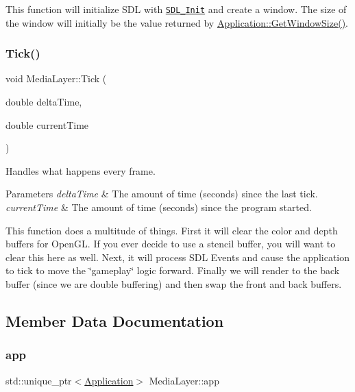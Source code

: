 This function will initialize S\+DL with \href{https://wiki.libsdl.org/SDL_Init}{\tt S\+D\+L\+\_\+\+Init} and create a window. The size of the window will initially be the value returned by \hyperlink{class_application_ab190ae0e987fe95682714dd4b2495e82}{Application\+::\+Get\+Window\+Size()}. \hypertarget{class_media_layer_a570ff8c3fc3e8f3e720d9dcebafba143}{}\label{class_media_layer_a570ff8c3fc3e8f3e720d9dcebafba143}
\subsubsection{\texorpdfstring{Tick()}{Tick()}}
{\footnotesize\ttfamily void Media\+Layer\+::\+Tick (\begin{DoxyParamCaption}\item[{double}]{delta\+Time,  }\item[{double}]{current\+Time }\end{DoxyParamCaption})}



Handles what happens every frame.


\begin{DoxyParams}{Parameters}
{\em delta\+Time} & The amount of time (seconds) since the last tick. \\
\hline
{\em current\+Time} & The amount of time (seconds) since the program started.\\
\hline
\end{DoxyParams}
This function does a multitude of things. First it will clear the color and depth buffers for Open\+GL. If you ever decide to use a stencil buffer, you will want to clear this here as well. Next, it will process S\+DL Events and cause the application to tick to move the \char`\"{}gameplay\char`\"{} logic forward. Finally we will render to the back buffer (since we are double buffering) and then swap the front and back buffers.

\subsection{Member Data Documentation}
\hypertarget{class_media_layer_a3cddf8a24527db756c3fe0534fce4f0c}{}\label{class_media_layer_a3cddf8a24527db756c3fe0534fce4f0c}
\subsubsection{\texorpdfstring{app}{app}}
{\footnotesize\ttfamily std\+::unique\+\_\+ptr$<$\hyperlink{class_application}{Application}$>$ Media\+Layer\+::app\hspace{0.3cm}{\ttfamily [private]}}



